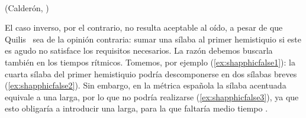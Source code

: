 \begin{exe}
	\ex
	\begin{xlist}
		\ex\label{ex:shapphic1}\\
		\strut\hfill(Calderón, )
		\ex {} \label{ex:shapphic2}
\end{xlist} 
\end{exe}

El caso inverso, por el contrario, no resulta aceptable al oído, a pesar de que Quilis~\parencite*[80]{quilis2013} sea de la opinión contraria: sumar una sílaba al primer hemistiquio si este es agudo no satisface los requisitos necesarios. La razón debemos buscarla también en los tiempos rítmicos. Tomemos, por ejemplo (\ref{ex:shapphicfalse1}): la cuarta sílaba del primer hemistiquio podría descomponerse en dos sílabas breves (\ref{ex:shapphicfalse2}). Sin embargo, en la métrica española la sílaba acentuada equivale a una larga, por lo que no podría realizarse (\ref{ex:shapphicfalse3}), ya que esto obligaría a introducir una larga, para la que faltaría medio tiempo \parencite[393-396]{martinez1938}.
\begin{exe}\ex
	\begin{xlist}
		\ex\label{ex:shapphicfalse1}
		\ex\label{ex:shapphicfalse2}
		\ex{*}\label{ex:shapphicfalse3}
	\end{xlist}
\end{exe}

